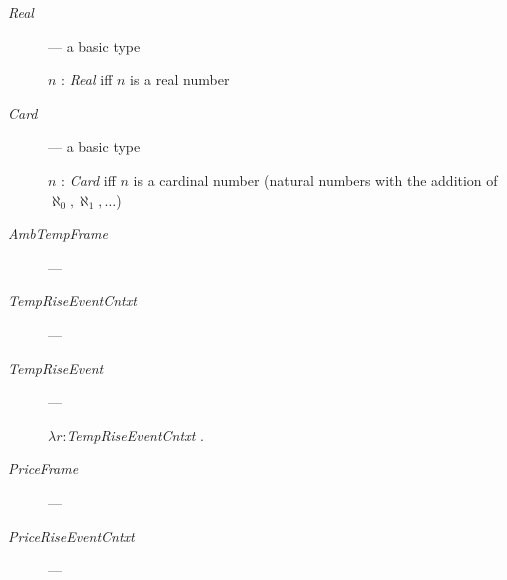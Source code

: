 \begin{description}
  
\item[\textnormal{\textit{Real}}] --- a basic type

  $n$ : \textit{Real} iff $n$ is a real number

  
\item[\textnormal{\textit{Card}}] --- a basic type

  $n$ : \textit{Card} iff $n$ is a cardinal number (natural numbers
  with the addition of $\aleph_0, \aleph_1,\ldots$)
 

  

\item[\textnormal{\textit{AmbTempFrame}}] --- 

      
    \item[\textnormal{\textit{TempRiseEventCntxt}}] ---
      
    \item[\textnormal{\textit{TempRiseEvent}}] ---
      
      $\lambda r$:\textit{TempRiseEventCntxt} .\\  
\hspace*{2em}
      
    \item[\textnormal{\textit{PriceFrame}}] --- 
      
    \item[\textnormal{\textit{PriceRiseEventCntxt}}] --- 
 

\end{description}
